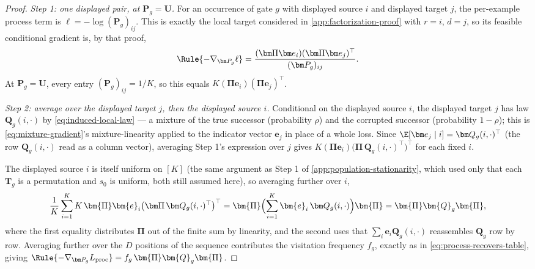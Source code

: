 \begin{proof}
\emph{Step 1: one displayed pair, at $\bm P_g=\bm U$.} For an occurrence of
gate $g$ with displayed source $i$ and displayed target $j$, the per-example
process term is $\ell=-\log(\bm P_g)_{ij}$. This is exactly the local target
considered in \cref{app:factorization-proof} with $r=i$, $d=j$, so its
feasible conditional gradient is, by that proof,
\[
 \Rule{-\nabla_{\bm P_g}\ell}=\frac{(\bm\Pi\bm e_i)(\bm\Pi\bm e_j)^\top}{(\bm P_g)_{ij}}.
\]
At $\bm P_g=\bm U$, every entry $(\bm P_g)_{ij}=1/K$, so this equals
$K(\bm\Pi\bm e_i)(\bm\Pi\bm e_j)^\top$.

\emph{Step 2: average over the displayed target $j$, then the displayed
source $i$.} Conditional on the displayed source $i$, the displayed target
$j$ has law $\bm Q_g(i,\cdot)$ by \cref{eq:induced-local-law} --- a mixture
of the true successor (probability $\rho$) and the corrupted successor
(probability $1-\rho$); this is \cref{eq:mixture-gradient}'s
mixture-linearity applied to the indicator vector $\bm e_j$ in place of a
whole loss. Since $\E[\bm e_j\mid i]=\bm Q_g(i,\cdot)^\top$ (the row
$\bm Q_g(i,\cdot)$ read as a column vector), averaging Step 1's expression
over $j$ gives $K(\bm\Pi\bm e_i)\bigl(\bm\Pi\,\bm Q_g(i,\cdot)^\top\bigr)^\top$
for each fixed $i$.

The displayed source $i$ is itself uniform on $[K]$ (the same argument as
Step 1 of \cref{app:population-stationarity}, which used only that each
$\bm T_g$ is a permutation and $s_0$ is uniform, both still assumed here),
so averaging further over $i$,
\[
 \frac1K\sum_{i=1}^{K}K\,\bm{\Pi} \bm{e}_i\bigl(\bm\Pi\,\bm Q_g(i,\cdot)^\top\bigr)^\top
 =\bm{\Pi}\Bigl(\sum_{i=1}^K \bm{e}_i\,\bm Q_g(i,\cdot)\Bigr)\bm{\Pi}
 =\bm{\Pi} \bm{Q}_g\bm{\Pi},
\]
where the first equality distributes $\bm\Pi$ out of the finite sum by
linearity, and the second uses that $\sum_i\bm e_i\bm Q_g(i,\cdot)$
reassembles $\bm Q_g$ row by row. Averaging further over the $D$ positions
of the sequence contributes the visitation frequency $f_g$, exactly as in
\cref{eq:process-recovers-table}, giving
$\Rule{-\nabla_{\bm P_g}L_{\rm proc}}=f_g\,\bm{\Pi} \bm{Q}_g\bm{\Pi}$.


\end{proof}
